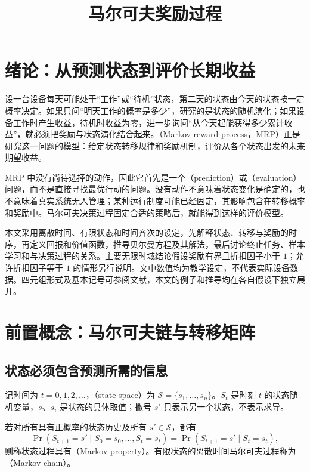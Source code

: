 \documentclass[UTF8]{ctexart}
\title{马尔可夫奖励过程}
\author{}
\date{}
\begin{document}
\maketitle
\tableofcontents

\section{绪论：从预测状态到评价长期收益}
\label{sec:mrp-intro}

设一台设备每天可能处于“工作”或“待机”状态，第二天的状态由今天的状态按一定概率决定。如果只问“明天工作的概率是多少”，研究的是状态的随机演化；如果设备工作时产生收益，待机时收益为零，进一步询问“从今天起能获得多少累计收益”，就必须把奖励与状态演化结合起来。（Markov reward process，MRP）正是研究这一问题的模型：给定状态转移规律和奖励机制，评价从各个状态出发的未来期望收益。

MRP 中没有尚待选择的动作，因此它首先是一个（prediction）或（evaluation）问题，而不是直接寻找最优行动的问题。没有动作不意味着状态变化是确定的，也不意味着真实系统无人管理；某种运行制度可能已经固定，其影响包含在转移概率和奖励中。马尔可夫决策过程固定合适的策略后，就能得到这样的评价模型。

本文采用离散时间、有限状态和时间齐次的设定，先解释状态、转移与奖励的时序，再定义回报和价值函数，推导贝尔曼方程及其解法，最后讨论终止任务、样本学习和与决策过程的关系。主要无限时域结论假设奖励有界且折扣因子小于 $1$；允许折扣因子等于 $1$ 的情形另行说明。文中数值均为教学设定，不代表实际设备数据。四元组形式及基本记号可参阅文献\cite{silver-mrp}，本文的例子和推导均在各自假设下独立展开。

\section{前置概念：马尔可夫链与转移矩阵}
\label{sec:mrp-chain}

\subsection{状态必须包含预测所需的信息}

记时间为 $t=0,1,2,\ldots$，（state space）为 $\mathcal S=\{s_1,\ldots,s_n\}$。$S_t$ 是时刻 $t$ 的状态随机变量，$s$、$s_i$ 是状态的具体取值；撇号 $s'$ 只表示另一个状态，不表示求导。

\begin{definition}[马尔可夫性质]
若对所有具有正概率的状态历史及所有 $s'\in\mathcal S$，都有
\begin{equation}
  \Pr(S_{t+1}=s'\mid S_0=s_0,\ldots,S_t=s_t)
  =\Pr(S_{t+1}=s'\mid S_t=s_t),
  \label{eq:mrp-markov}
\end{equation}
则称状态过程具有（Markov property）。有限状态的离散时间马尔可夫过程称为（Markov chain）。
\end{definition}
\end{document}

